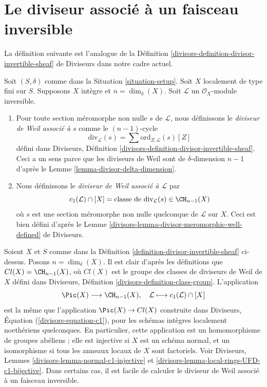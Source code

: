 \section{Le diviseur associé à un faisceau inversible}
\label{section-divisor-invertible-sheaf}

\noindent
La définition suivante est l'analogue de la
Définition \ref{divisors-definition-divisor-invertible-sheaf} de Diviseurs
dans notre cadre actuel.

\begin{definition}
\label{definition-divisor-invertible-sheaf}
Soit $(S, \delta)$ comme dans la Situation \ref{situation-setup}.
Soit $X$ localement de type fini sur $S$. Supposons $X$
intègre et $n = \dim_\delta(X)$.
Soit $\mathcal{L}$ un $\mathcal{O}_X$-module inversible.
\begin{enumerate}
\item Pour toute section méromorphe non nulle $s$ de $\mathcal{L}$,
nous définissons le {\it diviseur de Weil associé à $s$} comme le
$(n - 1)$-cycle
$$
\text{div}_\mathcal{L}(s) =
\sum \text{ord}_{Z, \mathcal{L}}(s) [Z]
$$
défini dans Diviseurs, Définition
\ref{divisors-definition-divisor-invertible-sheaf}.
Ceci a un sens parce que les diviseurs de Weil sont de $\delta$-dimension $n - 1$
d'après le Lemme \ref{lemma-divisor-delta-dimension}.
\item Nous définissons le {\it diviseur de Weil associé à $\mathcal{L}$} par
$$
c_1(\mathcal{L}) \cap [X] =
\text{classe de }\text{div}_\mathcal{L}(s) \in \CH_{n - 1}(X)
$$
où $s$ est une section méromorphe non nulle quelconque de $\mathcal{L}$ sur
$X$. Ceci est bien défini d'après le
Lemme \ref{divisors-lemma-divisor-meromorphic-well-defined} de Diviseurs.
\end{enumerate}
\end{definition}

\noindent
Soient $X$ et $S$ comme dans la Définition \ref{definition-divisor-invertible-sheaf}
ci-dessus. Posons $n = \dim_\delta(X)$. Il est clair d'après les définitions que
$Cl(X) = \CH_{n - 1}(X)$, où $Cl(X)$ est le groupe des classes de diviseurs de Weil de $X$
défini dans Diviseurs, Définition \ref{divisors-definition-class-group}.
L'application
$$
\Pic(X) \longrightarrow \CH_{n - 1}(X), \quad
\mathcal{L} \longmapsto c_1(\mathcal{L}) \cap [X]
$$
est la même que l'application $\Pic(X) \to Cl(X)$ construite dans
Diviseurs, Équation (\ref{divisors-equation-c1}), pour les schémas intègres
localement noethériens quelconques. En particulier, cette application
est un homomorphisme de groupes abéliens ; elle est injective si $X$ est
un schéma normal, et un isomorphisme si tous les anneaux locaux de $X$
sont factoriels. Voir Diviseurs, Lemmes \ref{divisors-lemma-normal-c1-injective} et
\ref{divisors-lemma-local-rings-UFD-c1-bijective}.
Dans certains cas, il est facile de calculer le
diviseur de Weil associé à un faisceau inversible.

